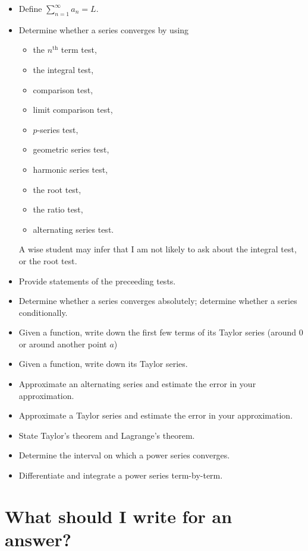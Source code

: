 \documentclass[12pt]{article}
\theoremstyle{definition}
\begin{document}
\begin{multicols}{2}
\begin{itemize}
\item Define $\displaystyle\sum_{n=1}^\infty a_n = L$.
\item Determine whether a series converges by using
\begin{itemize}
\item the $n^{\mbox{th}}$ term test,
\item the integral test,
\item comparison test,
\item limit comparison test,
\item $p$-series test,
\item geometric series test,
\item harmonic series test,
\item the root test,
\item the ratio test,
\item alternating series test.
\end{itemize}
A wise student may infer that I am not likely to ask about the integral test, or the root test.
\item Provide statements of the preceeding tests.
\item Determine whether a series converges absolutely; determine whether a series conditionally.
\item Given a function, write down the first few terms of its Taylor series (around $0$ or around another point $a$)
\item Given a function, write down its Taylor series.
\item Approximate an alternating series and estimate the error in your approximation.
\item Approximate a Taylor series and estimate the error in your approximation.
\item State Taylor's theorem and Lagrange's theorem.
\item Determine the interval on which a power series converges.
\item Differentiate and integrate a power series term-by-term.
\end{itemize}
\end{multicols}

\pagebreak

\section*{What should I write for an answer?}
\end{document}
